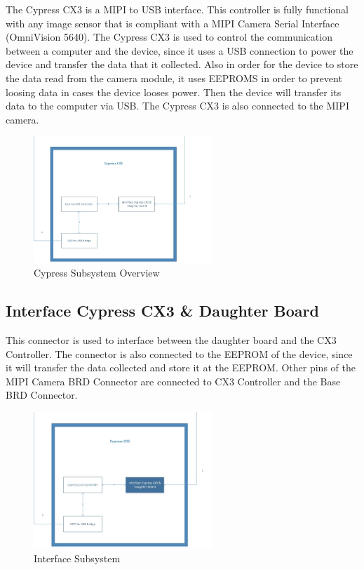The Cypress CX3 is a MIPI to USB interface. This controller is fully functional with any image sensor that is compliant with a MIPI Camera Serial Interface (OmniVision 5640). The Cypress CX3 is used to control the communication between a computer and the device, since it uses a USB connection to power the device and transfer the data that it collected. Also in order for the device to store the data read from the camera module, it uses EEPROMS in order to prevent loosing data in cases the device looses power. Then the device will transfer its data to the computer via USB. The Cypress CX3 is also connected to the MIPI camera.

\begin{figure}[h!]
	\centering
 	\includegraphics[width=0.60\textwidth]{images/Cypress.jpg}
 \caption{Cypress Subsystem Overview}
\end{figure}


\subsection{Interface Cypress CX3 & Daughter Board}
This connector is used to interface between the daughter board and the CX3 Controller. The connector is also connected to the EEPROM of the device, since it will transfer the data collected and store it at the EEPROM. Other pins of the MIPI Camera BRD Connector are connected to CX3 Controller and the Base BRD Connector.

\begin{figure}[h!]
	\centering
 	\includegraphics[width=0.60\textwidth]{images/Cypress_Interface.jpg}
 \caption{Interface Subsystem}
\end{figure}

